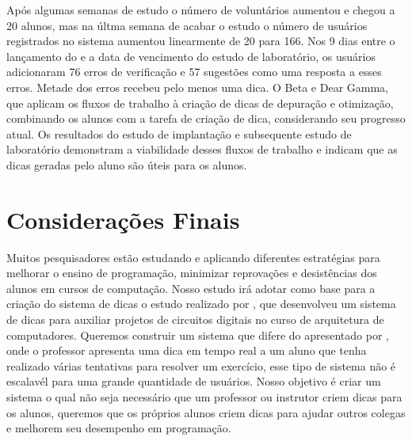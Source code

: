 Após algumas semanas de estudo o número de voluntários aumentou e chegou a 20 alunos, mas na últma semana de acabar o estudo o número de usuários registrados no sistema  aumentou linearmente de 20 para 166. Nos 9 dias entre o lançamento do  e a data de vencimento do estudo de laboratório, os usuários adicionaram 76 erros de verificação e 57 sugestões como uma resposta a esses erros. Metade dos erros recebeu pelo menos uma dica. O Beta e Dear Gamma, que aplicam os fluxos de trabalho à criação de dicas de depuração e otimização, combinando os alunos com a tarefa de criação de dica, considerando seu progresso atual. Os resultados do estudo de implantação e subsequente estudo de laboratório demonstram a viabilidade desses fluxos de trabalho e indicam que as dicas geradas pelo aluno são úteis para os alunos. 

\section{Considerações Finais}

Muitos pesquisadores estão estudando e aplicando diferentes estratégias para melhorar o ensino de programação, minimizar reprovações e desistências dos alunos em cursos de computação. Nosso estudo irá adotar como base para a criação do sistema de dicas o estudo realizado por , que desenvolveu um sistema de dicas para auxiliar projetos de circuitos digitais no curso de arquitetura de computadores. Queremos construir um sistema que difere do apresentado por , onde o professor apresenta uma dica em tempo real a um aluno que tenha realizado várias tentativas para resolver um exercício, esse tipo de sistema não é escalavél para uma grande quantidade de usuários. Nosso objetivo é criar um sistema o qual não seja necessário que um professor ou instrutor criem dicas para os alunos, queremos que os próprios alunos criem dicas para ajudar outros colegas e melhorem seu desempenho em programação.